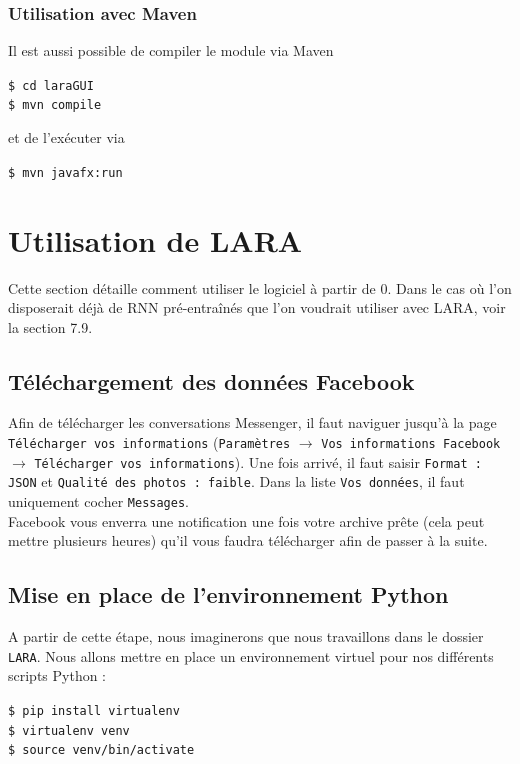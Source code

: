 \documentclass[10pt,a4paper]{article}
\newcommand\tab[1][0.5cm]{\hspace*{#1}}
\begin{document}
\subsubsection{Utilisation avec Maven}
Il est aussi possible de compiler le module via Maven
\begin{center}
	\texttt{\$ cd laraGUI} \\
	\texttt{\$ mvn compile}
\end{center}
et de l'exécuter via
\begin{center}
	\texttt{\$ mvn javafx:run}
\end{center}


\section{Utilisation de LARA}
Cette section détaille comment utiliser le logiciel à partir de 0. Dans le cas où l'on disposerait déjà de RNN pré-entraînés que l'on voudrait utiliser avec LARA, voir la section 7.9.
\subsection{Téléchargement des données Facebook}
Afin de télécharger les conversations Messenger, il faut naviguer jusqu'à la page \texttt{Télécharger vos informations} (\texttt{Paramètres} $\longrightarrow$ \texttt{Vos informations Facebook} $\longrightarrow$ \texttt{Télécharger vos informations}). Une fois arrivé, il faut saisir \texttt{Format : JSON} et \texttt{Qualité des photos : faible}. Dans la liste \texttt{Vos données}, il faut uniquement cocher \texttt{Messages}. \\
\tab Facebook vous enverra une notification une fois votre archive prête (cela peut mettre plusieurs heures) qu'il vous faudra télécharger afin de passer à la suite.
\subsection{Mise en place de l'environnement Python}
A partir de cette étape, nous imaginerons que nous travaillons dans le dossier \texttt{LARA}. Nous allons mettre en place un environnement virtuel pour nos différents scripts Python :
\begin{center}
	\texttt{\$ pip install virtualenv} \\
	\texttt{\$ virtualenv venv} \\
	\texttt{\$ source venv/bin/activate}
\end{center}
\end{document}
